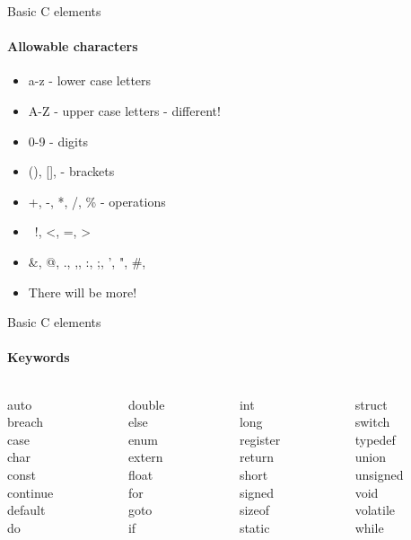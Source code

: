 \documentclass[10pt]{beamer}
\begin{document}
\begin{frame}{Basic C elements}
  \framesubtitle{Allowable characters}
  \begin{itemize}
    \item a-z - lower case letters
    \item A-Z - upper case letters - different!
    \item 0-9 - digits
    \item (), [], {} - brackets
    \item +, -, *, /, \% - operations
    \item \, !, <, =, >
    \item \&, @, ., ,, :, ;, ', ", \#,
    \item There will be more!
  \end{itemize}
\end{frame}

\begin{frame}{Basic C elements}
  \framesubtitle{Keywords}
  \begin{columns}
    \begin{column}{0.2\textwidth}
      auto\\
      breach\\
      case\\
      char\\
      const\\
      continue\\
      default\\
      do
    \end{column}
    \begin{column}{0.2\textwidth}
      double\\
      else\\
      enum\\
      extern\\
      float\\
      for\\
      goto\\
      if
    \end{column}
    \begin{column}{0.2\textwidth}
      int\\
      long\\
      register\\
      return\\
      short\\
      signed\\
      sizeof\\
      static
    \end{column}
    \begin{column}{0.2\textwidth}
      struct\\
      switch\\
      typedef\\
      union\\
      unsigned\\
      void\\
      volatile\\
      while
    \end{column}
  \end{columns}
 
\end{frame}
\end{document}
